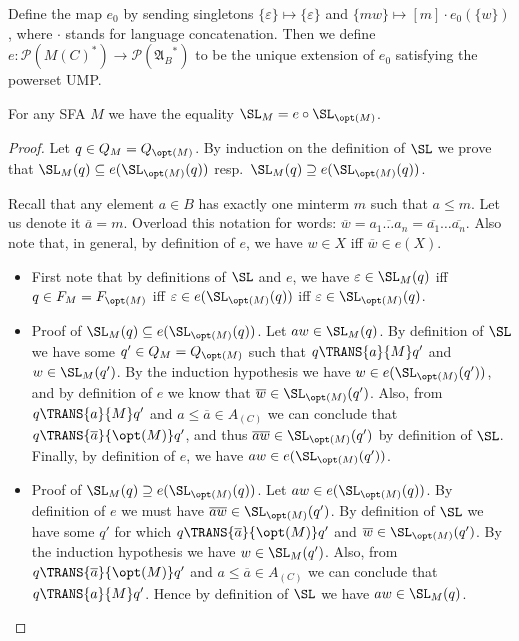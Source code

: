 \begin{definition}
Define the map $e_0$ by sending singletons $\{\varepsilon\} \mapsto \{\varepsilon\}$ and $\{mw\} \mapsto [m] \cdot e_0(\{w\})$, where ${\cdot}$ stands for language concatenation. Then we define $e : \mathcal{P}(M(C)^*) \to \mathcal{P}({\mathfrak{A}_B}^*)$ to be the unique extension of $e_0$ satisfying the powerset UMP.
\end{definition}

\begin{lem}
\label{opt-pres}
For any  SFA $M$ we have the equality $\SL_M = e \circ \SL_{\opt(M)}$.
\end{lem}
\begin{proof}
Let $q \in Q_M = Q_{\opt(M)}$. By induction on the definition of $\SL$ we prove that $\SL_M(q) \subseteq e(\SL_{\opt(M)}(q))$ resp.~$\SL_M(q) \supseteq e(\SL_{\opt(M)}(q))$.

Recall that any element $a \in B$ has exactly one minterm $m$ such that $a \le m$. Let us denote it $\overline{a} = m$. Overload this notation for words: $\overline{w} = \overline{a_1\dots a_n} = \overline{a_1} \dots \overline{a_n}$. Also note that, in general, by definition of $e$, we have $w \in X$ iff $\overline{w} \in e(X)$.

\begin{itemize}
\item First note that by definitions of $\SL$ and $e$, we have $\varepsilon \in \SL_M(q)$ iff $q \in F_M = F_{\opt(M)}$ iff $\varepsilon \in e(\SL_{\opt(M)}(q))$ iff $\varepsilon \in \SL_{\opt(M)}(q)$.
\item Proof of $\SL_M(q) \subseteq e(\SL_{\opt(M)}(q))$. Let $aw \in \SL_M(q)$. By definition of $\SL$ we have some $q' \in Q_M = Q_{\opt(M)}$ such that $q \TRANS{a}{M} q'$ and $w \in \SL_M(q')$. By the induction hypothesis we have $w \in e(\SL_{\opt(M)}(q'))$, and by definition of $e$ we know that $\overline{w} \in \SL_{\opt(M)}(q')$. Also, from $q \TRANS{a}{M} q'$ and $a \le \overline{a} \in A_{(C)}$ we can conclude that $q \TRANS{\overline{a}}{\opt(M)} q'$, and thus $\overline{aw} \in \SL_{\opt(M)}(q')$ by definition of $\SL$. Finally, by definition of $e$, we have $aw \in e(\SL_{\opt(M)}(q'))$.
%
\item Proof of $\SL_M(q) \supseteq e(\SL_{\opt(M)}(q))$. Let $aw \in e(\SL_{\opt(M)}(q))$. By definition of $e$ we must have $\overline{aw} \in \SL_{\opt(M)}(q')$. By definition of $\SL$ we have some $q'$ for which $q \TRANS{\overline{a}}{\opt(M)} q'$ and $\overline{w} \in \SL_{\opt(M)}(q')$. By the induction hypothesis we have $w \in \SL_M(q')$. Also, from $q \TRANS{\overline{a}}{\opt(M)} q'$ and $a \le \overline{a} \in A_{(C)}$ we can conclude that $q \TRANS{a}{M} q'$. Hence by definition of $\SL$ we have $aw \in \SL_M(q)$.
\end{itemize}
\end{proof}

